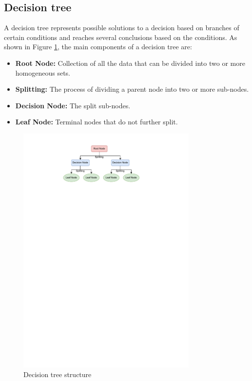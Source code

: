 \subsection{Decision tree}

A decision tree \cite{song2015decision} represents possible solutions to a decision based on branches of certain conditions and reaches several conclusions based on the conditions. As shown in Figure \ref{fig_decision_tree}, the main components of a decision tree are:

\begin{itemize}
\item \textbf{Root Node:} Collection of all the data that can be divided into two or more homogeneous sets.
\item \textbf{Splitting:} The process of dividing a parent node into two or more sub-nodes.
\item \textbf{Decision Node:} The split sub-nodes.
\item \textbf{Leaf Node:} Terminal nodes that do not further split.
\end{itemize}

\begin{figure}[H]
    \centering
    \includegraphics[width=0.8\textwidth]{figures/decision-tree.pdf}
    \caption{Decision tree structure}
    \label{fig_decision_tree}
\end{figure}

